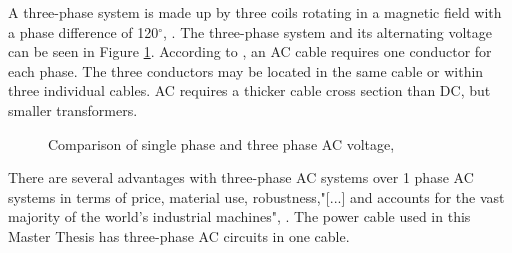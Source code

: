 \noindent A three-phase system is made up by three coils rotating in a magnetic field with a phase difference of 120$^{\circ}$, \cite{Dale2000}. The three-phase system and its alternating voltage can be seen in Figure \ref{fig:volt}. According to \cite{Beckman}, an AC cable requires one conductor for each phase. The three conductors may be located in the same cable or within three individual cables. AC requires a thicker cable cross section than DC, but smaller transformers.

\begin{figure}[H]
\hfill
{}\hfill
\caption[$\; \:$Comparison of single phase and three phase AC voltage]{Comparison of single phase and three phase AC voltage, \cite{Dale2000}}
\label{fig:volt}
\end{figure}

\noindent There are several advantages with three-phase AC systems over 1 phase AC systems in terms of price, material use, robustness,"[...] and accounts for the vast majority of the world's industrial machines", \cite{1995Tac}. The power cable used in this Master Thesis has three-phase AC circuits in one cable. 
 


